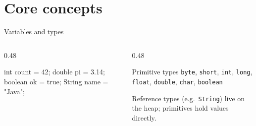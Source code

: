 \section{Core concepts}

\begin{frame}{Variables and types}
  \begin{columns}[T]
    \begin{column}{0.48\textwidth}
      \begin{semiverbatim}
int count = 42;
double pi = 3.14;
boolean ok = true;
String name = "Java";
      \end{semiverbatim}
    \end{column}
    \begin{column}{0.48\textwidth}
      \begin{block}{Primitive types}
        \texttt{byte}, \texttt{short}, \texttt{int}, \texttt{long},
        \texttt{float}, \texttt{double}, \texttt{char}, \texttt{boolean}
      \end{block}
      \medskip
      Reference types (e.g.\ \texttt{String}) live on the heap;
      primitives hold values directly.
    \end{column}
  \end{columns}
\end{frame}

